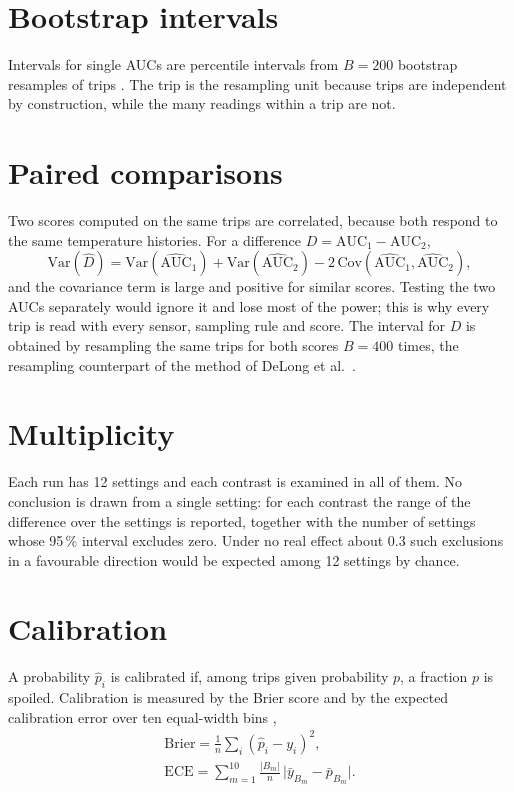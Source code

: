 \documentclass[11pt,a4paper,twoside,openany]{book}
\newcommand{\AUC}{\mathrm{AUC}}
\theoremstyle{plain}\newtheorem{proposition}{Proposition}\newtheorem{corollary}{Corollary}
\theoremstyle{definition}\newtheorem{definition}{Definition}[chapter]
\begin{document}
\section{Bootstrap intervals}
Intervals for single AUCs are percentile intervals from $B=200$ bootstrap resamples of trips \cite{efron1993}. The trip is the resampling unit because trips are independent by construction, while the many readings within a trip are not.

\section{Paired comparisons}
Two scores computed on the same trips are correlated, because both respond to the same temperature histories. For a difference $D=\AUC_1-\AUC_2$,
\begin{equation}\label{eq:vard}
\mathrm{Var}(\hat D)=\mathrm{Var}(\widehat{\AUC}_1)+\mathrm{Var}(\widehat{\AUC}_2)-2\,\mathrm{Cov}(\widehat{\AUC}_1,\widehat{\AUC}_2),
\end{equation}
and the covariance term is large and positive for similar scores. Testing the two AUCs separately would ignore it and lose most of the power; this is why every trip is read with every sensor, sampling rule and score. The interval for $D$ is obtained by resampling the same trips for both scores $B=400$ times, the resampling counterpart of the method of DeLong et al.\ \cite{delong1988}.

\section{Multiplicity}
Each run has 12 settings and each contrast is examined in all of them. No conclusion is drawn from a single setting: for each contrast the range of the difference over the settings is reported, together with the number of settings whose 95\,\% interval excludes zero. Under no real effect about 0.3 such exclusions in a favourable direction would be expected among 12 settings by chance.

\section{Calibration}
A probability $\hat p_i$ is calibrated if, among trips given probability $p$, a fraction $p$ is spoiled. Calibration is measured by the Brier score and by the expected calibration error over ten equal-width bins \cite{brier1950,naeini2015},
\begin{gather}
\mathrm{Brier}=\frac1n\sum_i(\hat p_i-y_i)^2,\label{eq:brier}\\
\mathrm{ECE}=\sum_{m=1}^{10}\frac{|B_m|}{n}\,\big|\bar y_{B_m}-\bar p_{B_m}\big|.\label{eq:ece}
\end{gather}
\end{document}

